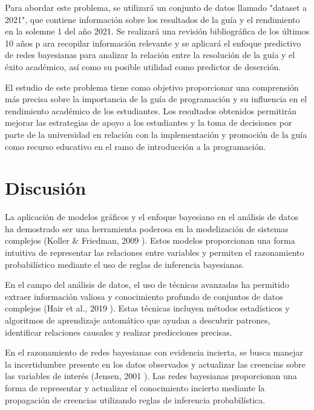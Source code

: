 Para abordar este problema, se utilizará un conjunto de datos llamado "dataset a 2021",
que contiene información sobre los resultados de la guía y el rendimiento en la
solemne 1 del año 2021. Se realizará una revisión bibliográfica de los últimos 10 años p
ara recopilar información relevante y se aplicará el enfoque predictivo de redes bayesianas
para analizar la relación entre la resolución de la guía y el éxito académico,
así como su posible utilidad como predictor de deserción.

El estudio de este problema tiene como objetivo proporcionar una comprensión más precisa
sobre la importancia de la guía de programación y su influencia en el rendimiento académico de los estudiantes.
Los resultados obtenidos permitirán mejorar las estrategias de apoyo a los estudiantes y la toma de decisiones
por parte de la universidad en relación con la implementación y promoción de la guía como recurso educativo
en el ramo de introducción a la programación.

\hypertarget{discusiuxf3n}{%
    \section{Discusión}\label{discusiuxf3n}}

La aplicación de modelos gráficos y el enfoque bayesiano en el análisis de datos ha demostrado ser una herramienta poderosa
en la modelización de sistemas complejos (Koller \& Friedman, 2009 \cite{koller2009introduction}). Estos modelos proporcionan
una forma intuitiva de representar las relaciones entre variables y permiten el razonamiento probabilístico mediante el uso de reglas de inferencia bayesianas.

En el campo del análisis de datos, el uso de técnicas avanzadas ha permitido extraer información valiosa y conocimiento profundo de conjuntos
de datos complejos (Hair et al., 2019 \cite{hair2019advanced}). Estas técnicas incluyen métodos estadísticos y algoritmos de aprendizaje
automático que ayudan a descubrir patrones, identificar relaciones causales y realizar predicciones precisas.

En el razonamiento de redes bayesianas con evidencia incierta, se busca manejar la incertidumbre presente en los datos observados y
actualizar las creencias sobre las variables de interés (Jensen, 2001 \cite{jensen2001bayesian}). Las redes bayesianas proporcionan
una forma de representar y actualizar el conocimiento incierto mediante la propagación de creencias utilizando reglas de inferencia probabilística.

